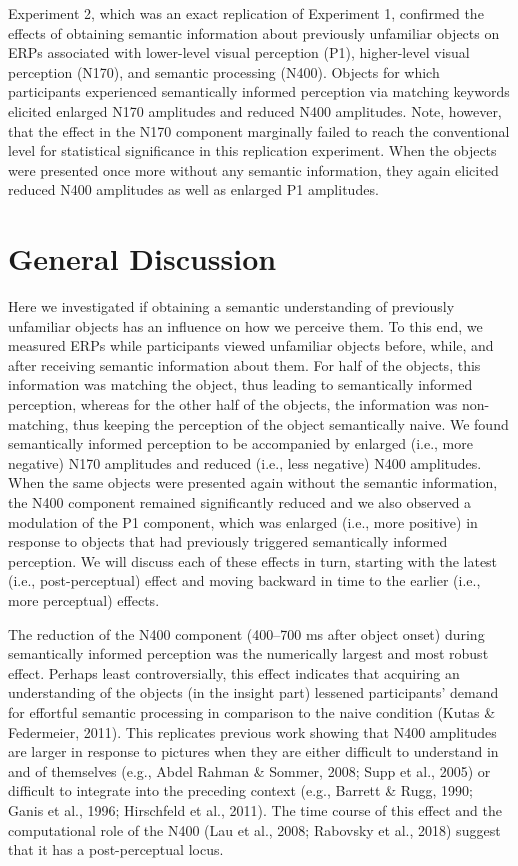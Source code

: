 \documentclass[
  english,
  doc,12pt,twoside,floatsintext]{apa7}
\begin{document}
Experiment 2, which was an exact replication of Experiment 1, confirmed the effects of obtaining semantic information about previously unfamiliar objects on ERPs associated with lower-level visual perception (P1), higher-level visual perception (N170), and semantic processing (N400). Objects for which participants experienced semantically informed perception via matching keywords elicited enlarged N170 amplitudes and reduced N400 amplitudes. Note, however, that the effect in the N170 component marginally failed to reach the conventional level for statistical significance in this replication experiment. When the objects were presented once more without any semantic information, they again elicited reduced N400 amplitudes as well as enlarged P1 amplitudes.

\hypertarget{general-discussion}{%
\section{General Discussion}\label{general-discussion}}

Here we investigated if obtaining a semantic understanding of previously unfamiliar objects has an influence on how we perceive them. To this end, we measured ERPs while participants viewed unfamiliar objects before, while, and after receiving semantic information about them. For half of the objects, this information was matching the object, thus leading to semantically informed perception, whereas for the other half of the objects, the information was non-matching, thus keeping the perception of the object semantically naive. We found semantically informed perception to be accompanied by enlarged (i.e., more negative) N170 amplitudes and reduced (i.e., less negative) N400 amplitudes. When the same objects were presented again without the semantic information, the N400 component remained significantly reduced and we also observed a modulation of the P1 component, which was enlarged (i.e., more positive) in response to objects that had previously triggered semantically informed perception. We will discuss each of these effects in turn, starting with the latest (i.e., post-perceptual) effect and moving backward in time to the earlier (i.e., more perceptual) effects.

The reduction of the N400 component (400--700 ms after object onset) during semantically informed perception was the numerically largest and most robust effect. Perhaps least controversially, this effect indicates that acquiring an understanding of the objects (in the insight part) lessened participants' demand for effortful semantic processing in comparison to the naive condition (Kutas \& Federmeier, 2011). This replicates previous work showing that N400 amplitudes are larger in response to pictures when they are either difficult to understand in and of themselves (e.g., Abdel Rahman \& Sommer, 2008; Supp et al., 2005) or difficult to integrate into the preceding context (e.g., Barrett \& Rugg, 1990; Ganis et al., 1996; Hirschfeld et al., 2011). The time course of this effect and the computational role of the N400 (Lau et al., 2008; Rabovsky et al., 2018) suggest that it has a post-perceptual locus.
\end{document}
